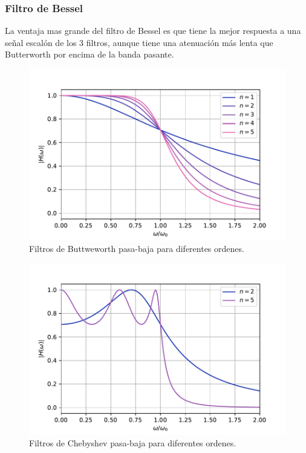 \documentclass[12pt,a4paper]{article}
\numberwithin{equation}{section}
\numberwithin{figure}{section}
\begin{document}
\subsubsection{Filtro de Bessel}

La ventaja mas grande del filtro de Bessel es que tiene la mejor respuesta a una señal escalón de los 3 filtros, aunque tiene una atenuación más lenta que Butterworth por encima de la banda pasante. 


\begin{figure}[h!] \centering
\includegraphics[scale=0.75]{2.3-Butterworth.pdf}
\caption{Filtros de Buttweworth pasa-baja para diferentes ordenes.}
\label{Fig:2.06}
\end{figure}

\begin{figure}[h!] \centering
\includegraphics[scale=0.75]{2.3-Chebyshev.pdf}
\caption{Filtros de Chebyshev pasa-baja para diferentes ordenes.}
\label{Fig:2.07}
\end{figure}
\end{document}
